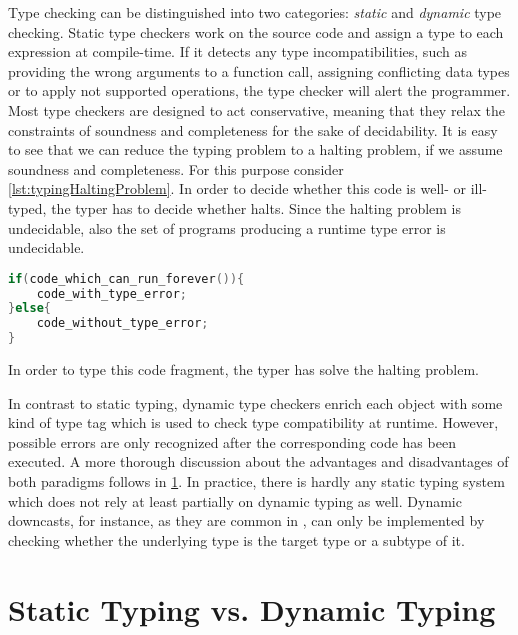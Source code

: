Type checking can be distinguished into two categories: \emph{static} and \emph{dynamic} type checking.
Static type checkers work on the source code and assign a type to each expression at compile-time.
If it detects any type incompatibilities, such as providing the wrong arguments to a function call, assigning conflicting data types or to apply not supported operations, the type checker will alert the programmer.
Most type checkers are designed to act conservative, meaning that they relax the constraints of soundness and completeness for the sake of decidability.
It is easy to see that we can reduce the typing problem to a halting problem, if we assume soundness and completeness.
For this purpose consider \cref{lst:typingHaltingProblem}.
In order to decide whether this code is well- or ill-typed, the typer has to decide whether  halts.
Since the halting problem is undecidable, also the set of programs producing a runtime type error is undecidable.
\begin{listing}[!h]
	\begin{CenteredBox}
		\begin{lstlisting}[language=C++]
if(code_which_can_run_forever()){
	code_with_type_error;
}else{
	code_without_type_error;
}
		\end{lstlisting}
	\end{CenteredBox}
	\caption{In order to type this code fragment, the typer has solve the halting problem.}
	\label{lst:typingHaltingProblem}
\end{listing}

In contrast to static typing, dynamic type checkers enrich each object with some kind of type tag which is used to check type compatibility at runtime.
However, possible errors are only recognized after the corresponding code has been executed.
A more thorough discussion about the advantages and disadvantages of both paradigms follows in \cref{sec:staticVSDynamic}.
In practice, there is hardly any static typing system which does not rely at least partially on dynamic typing as well.
Dynamic downcasts, for instance, as they are common in , can only be implemented by checking whether the underlying type is the target type or a subtype of it.

\section{Static Typing vs. Dynamic Typing}
\label{sec:staticVSDynamic}

